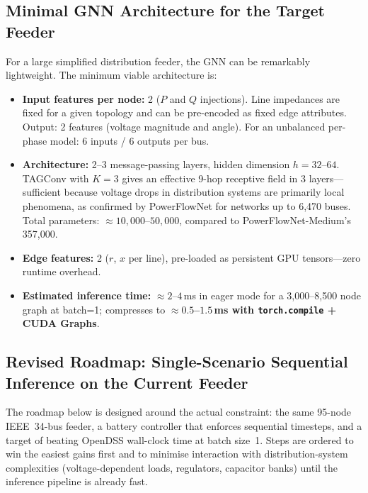 \documentclass[11pt]{article}
\begin{document}
\subsection{Minimal GNN Architecture for the Target Feeder}

For a large simplified distribution feeder, the GNN can be remarkably
lightweight.  The minimum viable architecture is:

\begin{itemize}
  \item \textbf{Input features per node:} 2 ($P$ and $Q$ injections).
        Line impedances are fixed for a given topology and can be
        pre-encoded as fixed edge attributes.  Output: 2 features
        (voltage magnitude and angle).  For an unbalanced per-phase model:
        6 inputs / 6 outputs per bus.

  \item \textbf{Architecture:} 2--3 message-passing layers, hidden
        dimension $h = 32$--$64$.  TAGConv with $K=3$ gives an effective
        9-hop receptive field in 3 layers---sufficient because voltage
        drops in distribution systems are primarily local phenomena, as
        confirmed by PowerFlowNet for networks up to 6,470 buses.
        Total parameters: ${\approx}10{,}000$--$50{,}000$, compared to
        PowerFlowNet-Medium's 357,000.

  \item \textbf{Edge features:} 2 ($r$, $x$ per line), pre-loaded as
        persistent GPU tensors---zero runtime overhead.

  \item \textbf{Estimated inference time:}  ${\approx}2$--$4$\,ms in
        eager mode for a 3,000--8,500 node graph at batch=1; compresses
        to \textbf{${\approx}0.5$--$1.5$\,ms with
        \texttt{torch.compile} + CUDA Graphs}.
\end{itemize}

\subsection{Revised Roadmap: Single-Scenario Sequential Inference on the Current Feeder}
\label{subsec:revised_roadmap}

The roadmap below is designed around the actual constraint: the same
95-node IEEE~34-bus feeder, a battery controller that enforces sequential
timesteps, and a target of beating OpenDSS wall-clock time at batch
size~1.  Steps are ordered to win the easiest gains first and to minimise
interaction with distribution-system complexities (voltage-dependent loads,
regulators, capacitor banks) until the inference pipeline is already fast.
\end{document}
